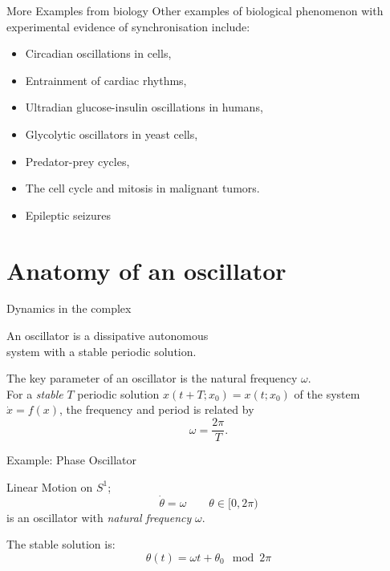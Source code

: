 \documentclass[11pt,reqno]{beamer}
\begin{document}
\begin{frame}{More Examples from biology}
Other examples of biological phenomenon with experimental evidence of synchronisation include\cite{synch}:
\begin{itemize}
	\item Circadian oscillations in cells,
	\item Entrainment of cardiac rhythms,
	\item Ultradian glucose-insulin oscillations in humans,
	\item Glycolytic oscillators in yeast cells,
	\item Predator-prey cycles,
	\item The cell cycle and mitosis in malignant tumors.
	\item Epileptic seizures
\end{itemize}
\end{frame}
\section{Anatomy of an oscillator}
\begin{frame}{Dynamics in the complex}
\begin{tcolorbox}[notitle, boxrule=0pt, colback=lred]
\centering
An oscillator is a dissipative autonomous\\ system with a stable periodic solution.
\end{tcolorbox}
\vfill
The key parameter of an oscillator is the natural frequency $\omega$.\\
\vfill
For a \emph{stable} $T$ periodic solution $x(t+T;x_0) = x(t;x_0)$ of the system $\dot{x} = f(x)$, the frequency and period is related by
\[
\omega = \frac{2\pi}{T}.
\]
\end{frame}
\begin{frame}{Example: Phase Oscillator}
\begin{minipage}{0.65\textwidth}
Linear Motion on $S^1$;
\[
\dot{\theta} = \omega \qquad  \theta \in [0,2\pi)
\]
is an oscillator with \emph{natural frequency} $\omega$.

The stable solution is:
\[
\theta(t) = \omega t + \theta_0 \mod 2\pi
\]
\end{minipage}
\begin{minipage}{0.3\textwidth}
\end{minipage}
\end{frame}
\end{document}
